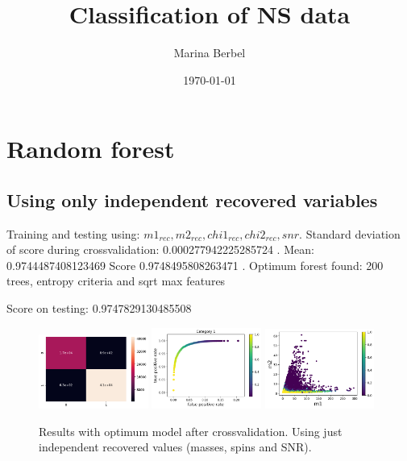 \documentclass[prd,aps,twocolumn,a4paper,showkeys,nofootinbib]{revtex4-2}
\begin{document}
\title{Classification of NS data}

\author{Marina Berbel}

\date{\today}

\maketitle

\section{Random forest}


\subsection{Using only independent recovered variables}
Training and testing using: $m1_{rec}, m2_{rec}, chi1_{rec}, chi2_{rec}, snr$.
Standard deviation of score during crossvalidation:  0.000277942225285724 . Mean:  0.9744487408123469
Score  0.9748495808263471 . Optimum forest found:  200  trees,  entropy  criteria and  sqrt  max features

Score on testing:  0.9747829130485508

\begin{figure}[]
\includegraphics[width=0.32\textwidth]{./FigNSclass/CM_indRecCross}
\includegraphics[width=0.32\textwidth]{./FigNSclass/rocCurve_indRecCross}
\includegraphics[width=0.32\textwidth]{./FigNSclass/scatterplot_indRecCross}
\caption{\label{fig:indreccross} Results with optimum model after crossvalidation. Using just independent recovered values (masses, spins and SNR).}
\end{figure}
\end{document}
